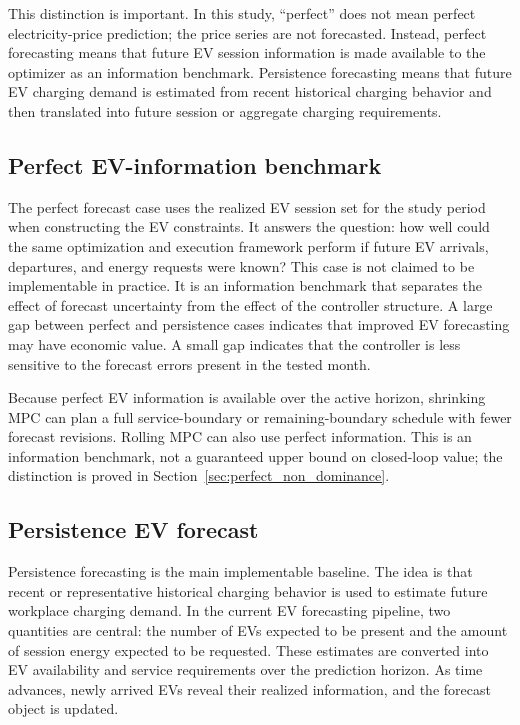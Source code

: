 \documentclass[final,5p,times]{elsarticle}
\begin{document}
This distinction is important. In this study, ``perfect'' does not mean perfect electricity-price prediction; the price series are not forecasted. Instead, perfect forecasting means that future EV session information is made available to the optimizer as an information benchmark. Persistence forecasting means that future EV charging demand is estimated from recent historical charging behavior and then translated into future session or aggregate charging requirements.

\subsection{Perfect EV-information benchmark}
The perfect forecast case uses the realized EV session set for the study period when constructing the EV constraints. It answers the question: how well could the same optimization and execution framework perform if future EV arrivals, departures, and energy requests were known? This case is not claimed to be implementable in practice. It is an information benchmark that separates the effect of forecast uncertainty from the effect of the controller structure. A large gap between perfect and persistence cases indicates that improved EV forecasting may have economic value. A small gap indicates that the controller is less sensitive to the forecast errors present in the tested month.

Because perfect EV information is available over the active horizon, shrinking MPC can plan a full service-boundary or remaining-boundary schedule with fewer forecast revisions. Rolling MPC can also use perfect information. This is an information benchmark, not a guaranteed upper bound on closed-loop value; the distinction is proved in Section~\ref{sec:perfect_non_dominance}.

\subsection{Persistence EV forecast}
Persistence forecasting is the main implementable baseline. The idea is that recent or representative historical charging behavior is used to estimate future workplace charging demand. In the current EV forecasting pipeline, two quantities are central: the number of EVs expected to be present and the amount of session energy expected to be requested. These estimates are converted into EV availability and service requirements over the prediction horizon. As time advances, newly arrived EVs reveal their realized information, and the forecast object is updated.
\end{document}
